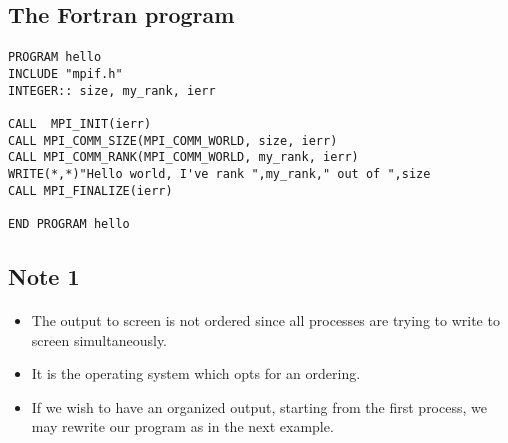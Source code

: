 \documentclass[%
oneside,                 %
final,                   %
10pt]{article}
\begin{document}
\subsection*{The Fortran program}

\paragraph{}












\begin{Verbatim}[numbers=none,fontsize=\fontsize{9pt}{9pt},baselinestretch=0.95]
PROGRAM hello
INCLUDE "mpif.h"
INTEGER:: size, my_rank, ierr

CALL  MPI_INIT(ierr)
CALL MPI_COMM_SIZE(MPI_COMM_WORLD, size, ierr)
CALL MPI_COMM_RANK(MPI_COMM_WORLD, my_rank, ierr)
WRITE(*,*)"Hello world, I've rank ",my_rank," out of ",size
CALL MPI_FINALIZE(ierr)

END PROGRAM hello

\end{Verbatim}



\subsection*{Note 1}

\paragraph{}

\begin{itemize}
\item The output to screen is not ordered since all processes are trying to write  to screen simultaneously.

\item It is the operating system which opts for an ordering.  

\item If we wish to have an organized output, starting from the first process, we may rewrite our program as in the next example.
\end{itemize}

\noindent
\end{document}

